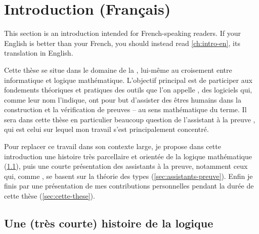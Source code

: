 \chapter{Introduction (Français)}
\label{ch:intro-fr}

\margintoc

\begin{kaobox}[backgroundcolor=Black!10!White,frametitlebackgroundcolor=Black!10!White]
  This section is an introduction intended for French-speaking readers.
  If your English is better than your French,
  you should instead read \cref{ch:intro-en}, its translation in English.
\end{kaobox}


Cette thèse se situe dans le domaine de la , lui-même au croisement entre informatique et logique mathématique.
L’objectif principal est de participer aux fondements théoriques et pratiques des outils
que l’on appelle , des logiciels qui, comme leur nom
l’indique, ont pour but d’assister des êtres humains dans la construction
et la vérification de preuves – au sens mathématique du terme. Il sera dans cette thèse
en particulier beaucoup question de l’assistant à la preuve , qui est celui
sur lequel mon travail s’est principalement concentré.

Pour replacer ce travail dans son contexte large, je propose dans cette introduction une histoire très parcellaire et orientée de la logique mathématique
(\cref{sec:logique-histoire}), puis une courte présentation des assistants à la preuve,
notamment ceux qui, comme , se basent sur la théorie des types (\cref{sec:assistants-preuve}). Enfin je finis par une présentation de mes contributions
personnelles pendant la durée de cette thèse (\cref{sec:cette-these}).

\section{Une (très courte) histoire de la logique}
\label{sec:logique-histoire}

